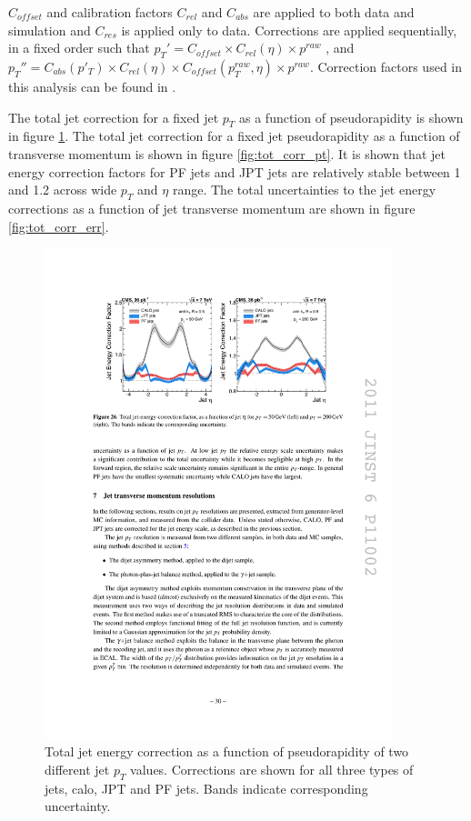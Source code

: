 $C_{offset}$ and calibration factors $C_{rel}$ and $C_{abs}$ are applied to both data and simulation and $C_{res}$ is applied only to data. Corrections are applied sequentially, in a fixed order such that $p_T' = C_{offset} \times C_{rel}(\eta) \times p^{raw}$ , and $p_T'' = C_{abs}(p'_T) \times C_{rel}(\eta) \times C_{offset}(p_T^{raw},\eta)\times p^{raw}$. Correction factors used in this analysis can be found in \cite{CMS-DP-2013-033}.
\par The total jet correction for a fixed jet $p_T$ as a function of pseudorapidity is shown in figure \ref{fig:tot_corr_eta}. The total jet correction for a fixed jet pseudorapidity as a function of transverse momentum is shown in figure \ref{fig:tot_corr_pt}. It is shown that jet energy correction factors for PF jets and JPT jets are relatively stable between 1 and 1.2 across wide $p_T$ and $\eta$ range. The total uncertainties to the jet energy corrections as a function of jet transverse momentum are shown in figure \ref{fig:tot_corr_err}.
\begin{figure}[htbp]
	\centering
		\includegraphics[width=0.9\textwidth]{Figures/jet_tot_corr_eta.pdf}
	\caption[Total jet energy correction as a function of pseudorapidity of two different jet $p_T$ values.]{Total jet energy correction as a function of pseudorapidity of two different jet $p_T$ values. Corrections are shown for all three types of jets, calo, JPT and PF jets. Bands indicate corresponding uncertainty.\cite{Chatrchyan:2011ds}}
	\label{fig:tot_corr_eta}
\end{figure}

